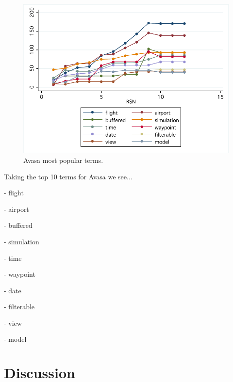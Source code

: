 \begin{figure}[t]
\centering
\includegraphics[width=\textwidth]{Figures/Vocab-AvasaPopular.pdf}
\caption{Avasa most popular terms.}
\label{fig:vocab-popular-terms-avasa}
\end{figure}

Taking the top 10 terms for Avasa we see...

\crumbs
{
- flight

- airport

- buffered

- simulation

- time

- waypoint

- date

- filterable

- view

- model
}




% 
% 
% 

\section{Discussion} %
\label{sec:discussion}

